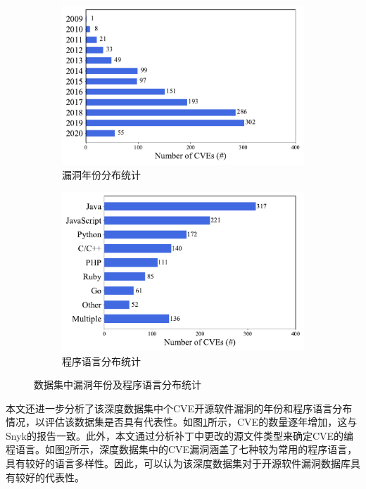 \begin{figure}[!t]
    \centering
    \begin{subfigure}[b]{0.45\textwidth}
    \centering
    \includegraphics[scale=0.46]{res/rq0-year.pdf}
    \caption{漏洞年份分布统计}\label{fig:rq0-year}
    \end{subfigure}
    \begin{subfigure}[b]{0.45\textwidth}
    \centering
    \includegraphics[scale=0.46]{res/rq0-language.pdf}
    \caption{程序语言分布统计}\label{fig:rq0-language}
    \end{subfigure}
    \caption{数据集中漏洞年份及程序语言分布统计}\label{fig:dataset}
\end{figure}


本文还进一步分析了该深度数据集中个CVE开源软件漏洞的年份和程序语言分布情况，以评估该数据集是否具有代表性。如图\ref{fig:rq0-year}所示，CVE的数量逐年增加，这与Snyk的报告\cite{Snyk-report}一致。此外，本文通过分析补丁中更改的源文件类型来确定CVE的编程语言。如图\ref{fig:rq0-language}所示，深度数据集中的CVE漏洞涵盖了七种较为常用的程序语言，具有较好的语言多样性。因此，可以认为该深度数据集对于开源软件漏洞数据库具有较好的代表性。


